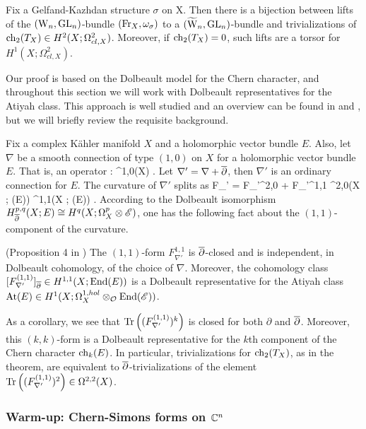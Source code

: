 \begin{thm}\label{extbundle} 
Fix a Gelfand-Kazhdan structure $\sigma$ on X. 
Then there is a bijection between  lifts of the $({{\rm W}_n}, {\rm GL}_n)$-bundle $({\rm Fr}_X, \omega_\sigma)$ to a $(\widetilde{{{\rm W}}}_n, {\rm GL}_n)$-bundle 
and trivializations of ${\rm ch}_2(T_X) \in H^2(X ; \Omega^{2}_{cl,X})$.
Moreover, if ${\rm ch}_2(T_X) = 0$, such lifts are a torsor for $H^1(X; \Omega^{2}_{cl,X})$. 
\end{thm}

Our proof is based on the Dolbeault model for the Chern character, and
throughout this section we will work with Dolbeault representatives for the Atiyah class. 
This approach is well studied and an overview can be found in \cite{atiyah} and \cite{kapranov1999}, 
but we will briefly review the requisite background.

Fix a complex K\"ahler manifold $X$ and a holomorphic vector bundle $E$. 
Also, let $\nabla$ be a smooth connection of type $(1,0)$ on $X$ for a
holomorphic vector bundle $E$. That is, an operator
\ben
\nabla : \sE \to \Omega^{1,0}(X) \tensor \sE .
\een
Let $\nabla ' = \nabla + \overline{\partial}$, then $\nabla'$ is an ordinary
connection for $E$. The curvature of $\nabla '$ splits as
\ben
F_{\nabla'} = F_{\nabla '}^{2,0} + F_{\nabla '}^{1,1} \in \Omega^{2,0}(X
; \End(E)) \oplus \Omega^{1,1}(X ; \End(E)) .
\een 
According to the Dolbeault isomorphism 
$H^{p,q}_{\overline{\partial}} (X ; E) \cong H^q(X ;  \Omega^p_X \otimes \mathscr E)$, 
one has the following fact about the $(1,1)$-component of the curvature. 

\begin{prop} (Proposition 4 in \cite{atiyah})
The $(1,1)$-form $F_{\nabla'}^{1,1}$ is $\overline{\partial}$-closed  and is independent, in Dolbeault cohomology, of the choice of $\nabla$. 
Moreover, the cohomology class $[F_{\nabla'}^{(1,1)}]_{\overline{\partial}} \in H^{1,1}(X ; {\rm End}(E))$ is a Dolbeault representative for the Atiyah class ${\rm At}(E) \in H^1(X ; \Omega^{1,hol}_X \otimes_{\mathcal O} {\rm End}(\mathscr E))$.
\end{prop}

As a corollary, we see that ${\rm Tr} \left((F_{\nabla'}^{(1,1)})^k\right)$ is closed for both $\partial$ and $\overline{\partial}$. 
Moreover, this $(k,k)$-form is a Dolbeault representative for the
$k$th component of the Chern character ${\rm ch}_k(E)$. In particular, trivializations for ${\rm ch}_2(T_X)$, as in the theorem, 
are equivalent to $\overline{\partial}$-trivializations of the element
${\rm Tr}\left( (F_{\nabla '}^{(1,1)})^2 \right) \in \Omega^{2,2}(X)$. 

\subsubsection{Warm-up: Chern-Simons forms on $\mathbb C^n$}

